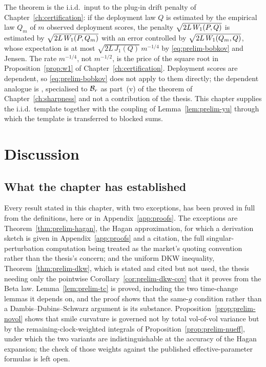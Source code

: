 \documentclass[../../../main.tex]{subfiles}
\begin{document}

The theorem is the i.i.d.\ input to the plug-in drift penalty of Chapter~\ref{ch:certification}: if the deployment law $Q$ is estimated by the empirical law $Q_m$ of $m$ observed deployment scores, the penalty $\sqrt{2L\,W_1(P,Q)}$ is estimated by $\sqrt{2L\,W_1(P,Q_m)}$ with an error controlled by $\sqrt{2L\,W_1(Q_m,Q)}$, whose expectation is at most $\sqrt{2L\,J_1(Q)}\,m^{-1/4}$ by \eqref{eq:prelim-bobkov} and Jensen. The rate $m^{-1/4}$, not $m^{-1/2}$, is the price of the square root in Proposition~\ref{prop:w1} of Chapter~\ref{ch:certification}. Deployment scores are dependent, so \eqref{eq:prelim-bobkov} does not apply to them directly; the dependent analogue is \cite[Prop.~3.2]{dedecker2017}, specialised to $\mathcal B_{r}$ as part~(v) of the theorem of Chapter~\ref{ch:sharpness} and not a contribution of the thesis. This chapter supplies the i.i.d.\ template together with the coupling of Lemma~\ref{lem:prelim-yu} through which the template is transferred to blocked sums.

\section{Discussion}\label{sec:prelim-discussion}

\subsection{What the chapter has established}

Every result stated in this chapter, with two exceptions, has been proved in full from the definitions, here or in Appendix~\ref{app:proofs}. The exceptions are Theorem~\ref{thm:prelim-hagan}, the Hagan approximation, for which a derivation sketch is given in Appendix~\ref{app:proofs} and a citation, the full singular-perturbation computation being treated as the market's quoting convention rather than the thesis's concern; and the uniform DKW inequality, Theorem~\ref{thm:prelim-dkw}, which is stated and cited but not used, the thesis needing only the pointwise Corollary~\ref{cor:prelim-dkw-cov} that it proves from the Beta law. Lemma~\ref{lem:prelim-tc} is proved, including the two time-change lemmas it depends on, and the proof shows that the same-$g$ condition rather than a Dambis--Dubins--Schwarz argument is its substance. Proposition~\ref{prop:prelim-novol} shows that smile curvature is governed not by total vol-of-vol variance but by the remaining-clock-weighted integrals of Proposition~\ref{prop:prelim-nueff}, under which the two variants are indistinguishable at the accuracy of the Hagan expansion; the check of those weights against the published effective-parameter formulas is left open.
\end{document}
